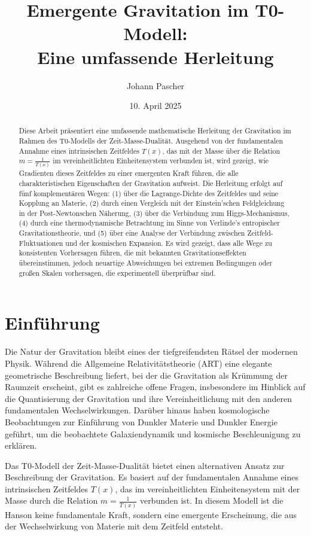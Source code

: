 \documentclass[12pt,a4paper]{article}
\title{Emergente Gravitation im T0-Modell: \\ Eine umfassende Herleitung}
\author{Johann Pascher}
\date{10. April 2025}
\newcommand{\Tfield}{T(x)}
\begin{document}
	
	\maketitle
	
	\begin{abstract}
		Diese Arbeit präsentiert eine umfassende mathematische Herleitung der Gravitation im Rahmen des T0-Modells der Zeit-Masse-Dualität. Ausgehend von der fundamentalen Annahme eines intrinsischen Zeitfeldes \(\Tfield\), das mit der Masse über die Relation \(m = \frac{1}{\Tfield}\) im vereinheitlichten Einheitensystem verbunden ist, wird gezeigt, wie Gradienten dieses Zeitfeldes zu einer emergenten Kraft führen, die alle charakteristischen Eigenschaften der Gravitation aufweist. Die Herleitung erfolgt auf fünf komplementären Wegen: (1) über die Lagrange-Dichte des Zeitfeldes und seine Kopplung an Materie, (2) durch einen Vergleich mit der Einstein'schen Feldgleichung in der Post-Newtonschen Näherung, (3) über die Verbindung zum Higgs-Mechanismus, (4) durch eine thermodynamische Betrachtung im Sinne von Verlinde's entropischer Gravitationstheorie, und (5) über eine Analyse der Verbindung zwischen Zeitfeld-Fluktuationen und der kosmischen Expansion. Es wird gezeigt, dass alle Wege zu konsistenten Vorhersagen führen, die mit bekannten Gravitationseffekten übereinstimmen, jedoch neuartige Abweichungen bei extremen Bedingungen oder großen Skalen vorhersagen, die experimentell überprüfbar sind.
	\end{abstract}
	
	\tableofcontents
	\newpage
	
	\section{Einführung}
	Die Natur der Gravitation bleibt eines der tiefgreifendsten Rätsel der modernen Physik. Während die Allgemeine Relativitätstheorie (ART) eine elegante geometrische Beschreibung liefert, bei der die Gravitation als Krümmung der Raumzeit erscheint, gibt es zahlreiche offene Fragen, insbesondere im Hinblick auf die Quantisierung der Gravitation und ihre Vereinheitlichung mit den anderen fundamentalen Wechselwirkungen. Darüber hinaus haben kosmologische Beobachtungen zur Einführung von Dunkler Materie und Dunkler Energie geführt, um die beobachtete Galaxiendynamik und kosmische Beschleunigung zu erklären.
	
	Das T0-Modell der Zeit-Masse-Dualität \cite{pascher_galaxies_2025} bietet einen alternativen Ansatz zur Beschreibung der Gravitation. Es basiert auf der fundamentalen Annahme eines intrinsischen Zeitfeldes \(\Tfield\), das im vereinheitlichten Einheitensystem mit der Masse durch die Relation \(m = \frac{1}{\Tfield}\) verbunden ist. In diesem Modell ist die Hanson keine fundamentale Kraft, sondern eine emergente Erscheinung, die aus der Wechselwirkung von Materie mit dem Zeitfeld entsteht.
	
\end{document}
